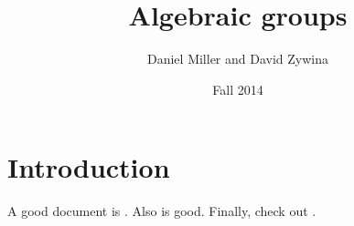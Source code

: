 \documentclass[oneside]{article}
\title{Algebraic groups}
\author{Daniel Miller and David Zywina}
\date{Fall 2014}
\begin{document}
\fontsize{10.5}{12.6} %
\selectfont

\maketitle
\tableofcontents


\section{Introduction}

A good document is \cite{hartshorne-1977}. Also \cite{sga3} is good. 
Finally, check out \cite{milne-LAG}. 


\printbibliography
\end{document}
